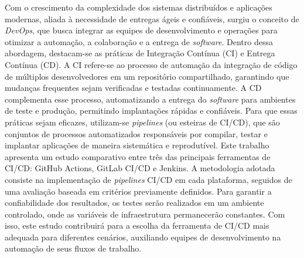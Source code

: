 
\begin{resumoutfpr}%
Com o crescimento da complexidade dos sistemas distribuídos e aplicações modernas, aliada à necessidade de entregas ágeis e confiáveis, surgiu o conceito de \textit{DevOps}, que busca integrar as equipes de desenvolvimento e operações para otimizar a automação, a colaboração e a entrega de \textit{software}. Dentro dessa abordagem, destacam-se as práticas de Integração Contínua (CI) e Entrega Contínua (CD). A CI refere-se ao processo de automação da integração de código de múltiplos desenvolvedores em um repositório compartilhado, garantindo que mudanças frequentes sejam verificadas e testadas continuamente. A CD complementa esse processo, automatizando a entrega do \textit{software} para ambientes de teste e produção, permitindo implantações rápidas e confiáveis. Para que essas práticas sejam eficazes, utilizam-se \textit{pipelines} (ou esteiras de CI/CD), que são conjuntos de processos automatizados responsáveis por compilar, testar e implantar aplicações de maneira sistemática e reprodutível.
Este trabalho apresenta um estudo comparativo entre três das principais ferramentas de CI/CD: GitHub Actions, GitLab CI/CD e Jenkins. A metodologia adotada consiste na implementação de \textit{pipelines} CI/CD em cada plataforma, seguidos de uma avaliação baseada em critérios previamente definidos. Para garantir a confiabilidade dos resultados, os testes serão realizados em um ambiente controlado, onde as variáveis de infraestrutura permanecerão constantes. Com isso, este estudo contribuirá para a escolha da ferramenta de CI/CD mais adequada para diferentes cenários, auxiliando equipes de desenvolvimento na automação de seus fluxos de trabalho.
\end{resumoutfpr}
